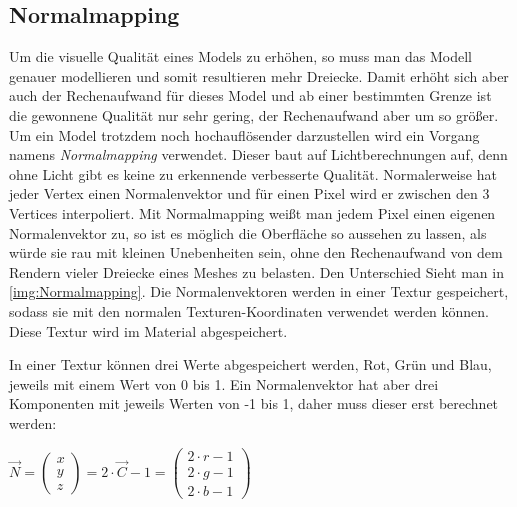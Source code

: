 \subsection{Normalmapping}
\label{section:Normalmapping}

Um die visuelle Qualität eines Models zu erhöhen, so muss man das Modell genauer modellieren und somit resultieren mehr Dreiecke. 
Damit erhöht sich aber auch der Rechenaufwand für dieses Model und ab einer bestimmten Grenze ist die gewonnene Qualität nur sehr gering, der Rechenaufwand aber um so größer. Um ein Model trotzdem noch hochauflösender darzustellen wird ein Vorgang namens \textit{Normalmapping} verwendet. 
Dieser baut auf Lichtberechnungen auf, denn ohne Licht gibt es keine zu erkennende verbesserte Qualität. Normalerweise hat jeder Vertex einen Normalenvektor und für einen Pixel wird er zwischen den 3 Vertices interpoliert. Mit Normalmapping weißt man jedem Pixel einen eigenen Normalenvektor zu, so ist es möglich die Oberfläche so aussehen zu lassen, als würde sie rau mit kleinen Unebenheiten sein, ohne den Rechenaufwand von dem Rendern vieler Dreiecke eines Meshes zu belasten.
Den Unterschied Sieht man in \cref{img:Normalmapping}. Die Normalenvektoren werden in einer Textur gespeichert, sodass sie mit den normalen Texturen-Koordinaten verwendet werden können. Diese Textur wird im Material abgespeichert.

In einer Textur können drei Werte abgespeichert werden, Rot, Grün und Blau, jeweils mit einem Wert von 0 bis 1. Ein Normalenvektor hat aber drei Komponenten mit jeweils Werten von -1 bis 1, daher muss dieser erst berechnet werden:

$ \overrightarrow{N} = 
\begin{pmatrix}
x \\ y \\ z
\end{pmatrix}
 = 2 \cdot \overrightarrow{C} - 1 = 
 \begin{pmatrix}
 2 \cdot r - 1 \\ 2 \cdot g - 1 \\ 2 \cdot b - 1
 \end{pmatrix}$
 
